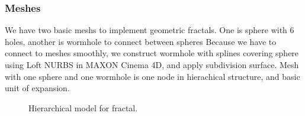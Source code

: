 \documentclass[a4paper]{article}
\begin{document}
\subsubsection{Meshes}
We have two basic meshs to implement geometric fractals.
One is sphere with 6 holes, another is wormhole to connect between spheres
Because we have to connect to meshes smoothly, we construct wormhole with splines covering sphere using Loft NURBS in MAXON Cinema 4D, and apply subdivision surface.
Mesh with one sphere and one wormhole is one node in hierachical structure, and basic unit of expansion.
\begin{figure}[H]
\centering
{}
\caption[1]{Hierarchical model for fractal.}
\end{figure}
\end{document}

